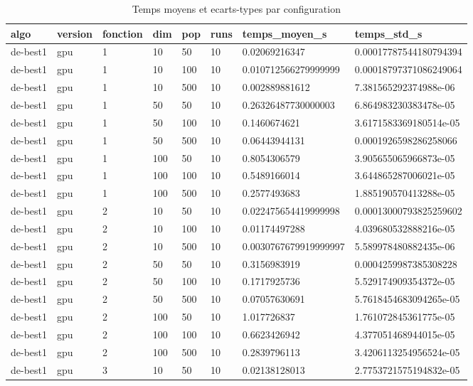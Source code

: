 \begin{table}[t]
\centering
\caption{Temps moyens et ecarts-types par configuration}
\label{tab:generated-times}
\scriptsize
\begin{tabular}{llllllll}
\toprule
algo & version & fonction & dim & pop & runs & temps\_moyen\_s & temps\_std\_s \\
\midrule
de-best1 & gpu & 1 & 10 & 50 & 10 & 0.02069216347 & 0.00017787544180794394 \\
de-best1 & gpu & 1 & 10 & 100 & 10 & 0.010712566279999999 & 0.00018797371086249064 \\
de-best1 & gpu & 1 & 10 & 500 & 10 & 0.002889881612 & 7.381565292374988e-06 \\
de-best1 & gpu & 1 & 50 & 50 & 10 & 0.26326487730000003 & 6.864983230383478e-05 \\
de-best1 & gpu & 1 & 50 & 100 & 10 & 0.1460674621 & 3.6171583369180514e-05 \\
de-best1 & gpu & 1 & 50 & 500 & 10 & 0.06443944131 & 0.0001926598286258066 \\
de-best1 & gpu & 1 & 100 & 50 & 10 & 0.8054306579 & 3.905655065966873e-05 \\
de-best1 & gpu & 1 & 100 & 100 & 10 & 0.5489166014 & 3.644865287006021e-05 \\
de-best1 & gpu & 1 & 100 & 500 & 10 & 0.2577493683 & 1.885190570413288e-05 \\
de-best1 & gpu & 2 & 10 & 50 & 10 & 0.022475654419999998 & 0.00013000793825259602 \\
de-best1 & gpu & 2 & 10 & 100 & 10 & 0.01174497288 & 4.039680532888216e-05 \\
de-best1 & gpu & 2 & 10 & 500 & 10 & 0.0030767679919999997 & 5.589978480882435e-06 \\
de-best1 & gpu & 2 & 50 & 50 & 10 & 0.3156983919 & 0.0004259987385308228 \\
de-best1 & gpu & 2 & 50 & 100 & 10 & 0.1717925736 & 5.529174909354372e-05 \\
de-best1 & gpu & 2 & 50 & 500 & 10 & 0.07057630691 & 5.7618454683094265e-05 \\
de-best1 & gpu & 2 & 100 & 50 & 10 & 1.017726837 & 1.761072845361775e-05 \\
de-best1 & gpu & 2 & 100 & 100 & 10 & 0.6623426942 & 4.377051468944015e-05 \\
de-best1 & gpu & 2 & 100 & 500 & 10 & 0.2839796113 & 3.4206113254956524e-05 \\
de-best1 & gpu & 3 & 10 & 50 & 10 & 0.02138128013 & 2.7753721575194832e-05 \\

\end{tabular}
\end{table}
